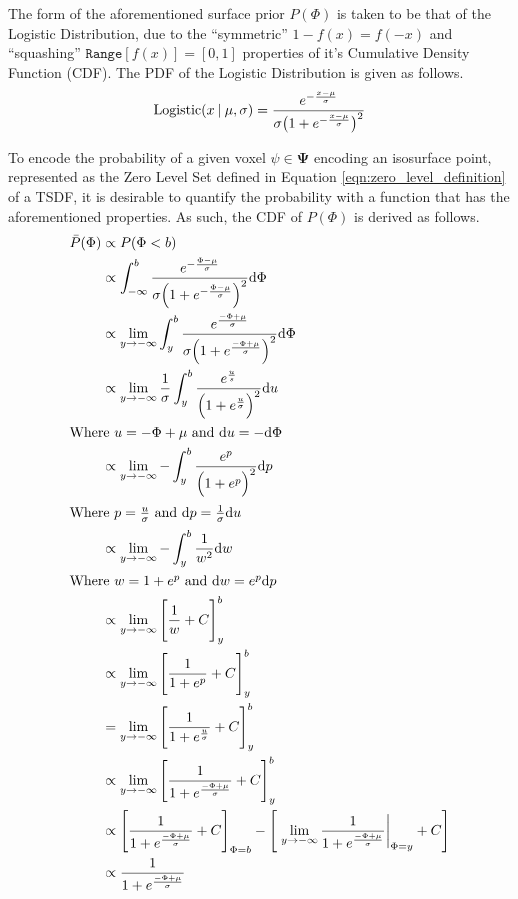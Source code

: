 The form of the aforementioned surface prior $P(\Phi)$ is taken to be that of
the Logistic Distribution, due to the ``symmetric'' $1 - f(x) = f(-x)$
and ``squashing'' $\texttt{Range}[f(x)] = [0, 1]$ properties of it's Cumulative
Density Function (CDF). The PDF of the Logistic Distribution is given as follows.
\begin{equation}
  \label{eqn:probobj_logistic_dist}
  \text{Logistic}(x \:\vert\: \mu, \sigma) = \frac
  {e^{-\frac{x - \mu}{\sigma}}}
  {\sigma \big( 1 + e^{-\frac{x - \mu}{\sigma}} \big)^{2}}
\end{equation}

To encode the probability of a given voxel $\psi \in \mathbf{\Psi}$ encoding an
isosurface point, represented as the Zero Level Set defined in Equation
\ref{eqn:zero_level_definition} of a TSDF, it is desirable to quantify the
probability with a function that has the aforementioned properties. As such, the
CDF of $P(\Phi)$ is derived as follows.
\begin{align}
  \label{eqn:probobj_surface_prior_cdf}
  \bar{P}(\Phi) &\propto P(\Phi < b)\\
  &\propto \int_{-\infty}^{b} \frac
  {e^{-\frac{\Phi - \mu}{\sigma}}}
  {\sigma \Big( 1 + e^{-\frac{\Phi - \mu}{\sigma}} \Big)^{2}} {\mathrm d{\Phi}}\\
  &\propto \lim_{y\to -\infty} \int_{y}^{b} \frac
  {e^{\frac{-\Phi + \mu}{\sigma}}}
  {\sigma \Big( 1 + e^{\frac{-\Phi + \mu}{\sigma}} \Big)^{2}} {\mathrm d{\Phi}}\\
  &\propto \lim_{y\to -\infty} \frac{1}{\sigma} \int_{y}^{b}
  \frac{e^{\frac{u}{s}}}{\Big( 1 + e^{\frac{u}{\sigma}} \Big)^{2}} {\mathrm d{u}}\\
  \shortintertext{Where $u = -\Phi + \mu$ and ${\mathrm d{u}} = -{\mathrm d{\Phi}}$}
  &\propto \lim_{y\to -\infty} -\int_{y}^{b}
  \frac{e^{p}}{\Big( 1 + e^{p} \Big)^{2}} {\mathrm d{p}}\\
  \shortintertext{Where $p = \frac{u}{\sigma}$ and ${\mathrm d{p}} = \frac{1}{\sigma}
  {\mathrm d{u}}$}
  &\propto \lim_{y\to -\infty} -\int_{y}^{b} \frac{1}{w^{2}} {\mathrm d{w}}\\
  \shortintertext{Where $w = 1 + e^{p}$ and ${\mathrm d{w}} = e^{p} {\mathrm d{p}}$}
  &\propto \lim_{y\to -\infty} \Bigg[ \frac{1}{w} + C \Bigg]_{y}^{b}\\
  &\propto \lim_{y\to -\infty} \Bigg[ \frac{1}{1 + e^{p}} + C \Bigg]_{y}^{b}\\
  &= \lim_{y\to -\infty} \Bigg[ \frac{1}{1 +e^{\frac{u}{\sigma}}} + C
  \Bigg]_{y}^{b}\\
  &\propto \lim_{y\to -\infty} \Bigg[ \frac{1}{1 + e^{\frac{-\Phi + \mu}{\sigma}}} +
  C \Bigg]_{y}^{b}\\
  &\propto \Bigg[ \frac{1}{1 + e^{\frac{-\Phi + \mu}{\sigma}}} + C \Bigg]_{\Phi = b}
  - \Bigg[ \left. \lim_{y\to -\infty} \frac{1}{1 + e^{\frac{-\Phi + \mu}{\sigma}}}
  \right\rvert_{\Phi = y} + C \Bigg]\\
  &\propto \frac{1}{1 + e^{\frac{-\Phi + \mu}{\sigma}}}
\end{align}
